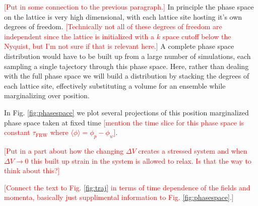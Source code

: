 
\textcolor{red}{[Put in some connection to the previous paragraph.]}
In principle the phase space on the lattice is very high dimensional, with each lattice site hosting it's own degrees of freedom. \textcolor{red}{[Technically not all of these degrees of freedom are independent since the lattice is initialized with a $k$ space cutoff below the Nyquist, but I'm not sure if that is relevant here.]} A complete phase space distribution would have to be built up from a large number of simulations, each sampling a single tajectory through this phase space. Here, rather than dealing with the full phase space we will build a distribution by stacking the degrees of each lattice site, effectively substituting a volume for an ensemble while marginalizing over position.

In Fig. \ref{fig:phasespace} we plot several projections of this position marginalized phase space taken at fixed time \textcolor{red}{[mention the time slice for this phase space is constant $\tau_\mathrm{FRW}$ where $\langle\phi\rangle=\phi_p-\phi_w$]}.



\textcolor{red}{[Put in a part about how the changing $\Delta V$ creates a stressed system and when $\Delta V \to 0$ this built up strain in the system is allowed to relax. Is that the way to think about this?]}

\Fphasespace


\textcolor{red}{[Connect the text to Fig. \ref{fig:traj} in terms of time dependence of the fields and momenta, basically just supplimental information to Fig. \ref{fig:phasespace}.]}

\Ftraj

